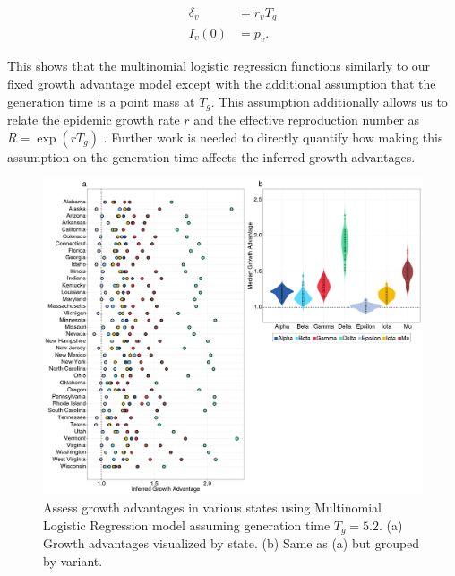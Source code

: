 \documentclass[11pt,oneside,letterpaper]{article}
\begin{document}
\begin{align}
  \delta_{v} &= r_{v}T_{g}\\
  I_{v}(0) &= p_{v}.
\end{align}

This shows that the multinomial logistic regression functions similarly to our fixed growth advantage model except with the additional assumption that the generation time is a point mass at $T_{g}$.
This assumption additionally allows us to relate the epidemic growth rate $r$ and the effective reproduction number as $R = \exp(r T_{g})$ \cite{Wallinga2006}.
Further work is needed to directly quantify how making this assumption on the generation time affects the inferred growth advantages.

\begin{figure}
  \centering
  \includegraphics[width=\linewidth]{figs/fig_MLR_growth_advantages_supp.png}
  \caption{Assess growth advantages in various states using Multinomial Logistic Regression model assuming generation time $T_{g} = 5.2$.
  (a) Growth advantages visualized by state.
  (b) Same as (a) but grouped by variant.}%
  \label{fig:MLR_growth_advantages}
\end{figure}


\end{document}
